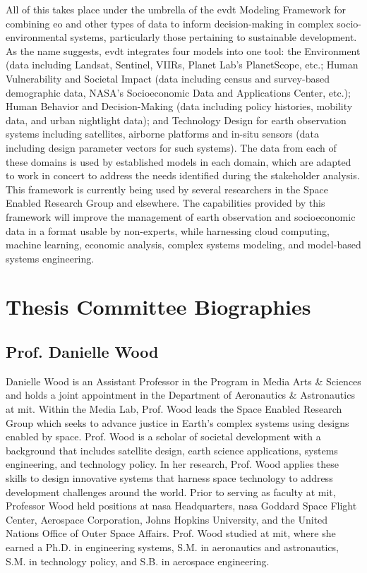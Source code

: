 \documentclass[notitlepage]{article}
\begin{document}
All of this takes place under the umbrella of the \ac{evdt} Modeling Framework for combining \ac{eo} and other types of data to inform decision-making in complex socio-environmental systems, particularly those pertaining to sustainable development. As the name suggests, \ac{evdt} integrates four models into one tool: the Environment (data including Landsat, Sentinel, VIIRs, Planet Lab’s PlanetScope, etc.; Human Vulnerability and Societal Impact (data including census and survey-based demographic data, NASA’s Socioeconomic Data and Applications Center, etc.); Human Behavior and Decision-Making (data including policy histories, mobility data, and urban nightlight data); and Technology Design for earth observation systems including satellites, airborne platforms and in-situ sensors (data including design parameter vectors for such systems). The data from each of these domains is used by established models in each domain, which are adapted to work in concert to address the needs identified during the stakeholder analysis. This framework is currently being used by several researchers in the Space Enabled Research Group and elsewhere. The capabilities provided by this framework will improve the management of earth observation and socioeconomic data in a format usable by non-experts, while harnessing cloud computing, machine learning, economic analysis, complex systems modeling, and model-based systems engineering.


\newpage

\section*{Thesis Committee Biographies}

\subsection*{Prof. Danielle Wood}

Danielle Wood is an Assistant Professor in the Program in Media Arts \& Sciences and holds a joint appointment in the Department of Aeronautics \& Astronautics at \ac{mit}. Within the Media Lab, Prof. Wood leads the Space Enabled Research Group which seeks to advance justice in Earth's complex systems using designs enabled by space. Prof. Wood is a scholar of societal development with a background that includes satellite design, earth science applications, systems engineering, and technology policy. In her research, Prof. Wood applies these skills to design innovative systems that harness space technology to address development challenges around the world. Prior to serving as faculty at \ac{mit}, Professor Wood held positions at \ac{nasa} Headquarters, \ac{nasa} Goddard Space Flight Center, Aerospace Corporation, Johns Hopkins University, and the United Nations Office of Outer Space Affairs. Prof. Wood studied at \ac{mit}, where she earned a Ph.D. in engineering systems, S.M. in aeronautics and astronautics, S.M. in technology policy, and S.B. in aerospace engineering.
\end{document}
